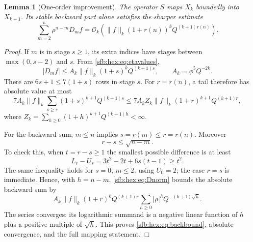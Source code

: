 \documentclass[11pt]{article}
\newtheorem{lemma}[theorem]{Lemma}
\theoremstyle{remark}\newtheorem{remark}[theorem]{Remark}
\newcommand{\OO}{\mathcal O}
\begin{document}
\begin{lemma}[One-order improvement]\label{sfb:hex:lem:mapping}
The operator $S$ maps $X_k$ boundedly into $X_{k+1}$. Its stable backward part alone satisfies the sharper estimate
\begin{equation}\label{sfb:hex:eq:backbound}
 \sum_{m=2}^n\rho^{n-m}D_mf
 =\OO_k\!\left(\|f\|_k(1+r(n))^kQ^{(k+1)r(n)}\right).
\end{equation}
\end{lemma}
\begin{proof}
If $m$ is in stage $s\ge1$, its extra indices have stages between $\max(0,s-2)$ and $s$. From \eqref{sfb:hex:eq:etavalues},
\begin{equation}\label{sfb:hex:eq:Dnorm}
 |D_mf|\le A_k\|f\|_k(1+s)^kQ^{(k+1)s},
 \qquad A_k=\phi^5Q^{-2k}.
\end{equation}
There are $6s+1\le7(1+s)$ rows in stage $s$. For $r=r(n)$, a tail therefore has absolute value at most
\begin{equation}\label{sfb:hex:eq:tailnorm}
 7A_k\|f\|_k\sum_{s\ge r}(1+s)^{k+1}Q^{(k+1)s}
 \le7A_k Z_k\|f\|_k(1+r)^{k+1}Q^{(k+1)r},
\end{equation}
where $Z_k=\sum_{h\ge0}(1+h)^{k+1}Q^{(k+1)h}<\infty$.

For the backward sum, $m\le n$ implies $s=r(m)\le r=r(n)$. Moreover
\begin{equation}\label{sfb:hex:eq:stagedistance}
 r-s\le\sqrt{n-m}.
\end{equation}
To check this, when $t=r-s\ge1$ the smallest possible difference is at least
\[
 L_r-U_s=3t^2-2t+6s(t-1)\ge t^2.
\]
The same inequality holds for $s=0$, $m\le2$, using $U_0=2$; the case $r=s$ is immediate. Hence, with $h=n-m$, \eqref{sfb:hex:eq:Dnorm} bounds the absolute backward sum by
\begin{equation}\label{sfb:hex:eq:Vbound}
 A_k\|f\|_k(1+r)^kQ^{(k+1)r}
 \sum_{h\ge0}|\rho|^hQ^{-(k+1)\sqrt h}.
\end{equation}
The series converges: its logarithmic summand is a negative linear function of $h$ plus a positive multiple of $\sqrt h$. This proves \eqref{sfb:hex:eq:backbound}, absolute convergence, and the full mapping statement.
\end{proof}
\end{document}
